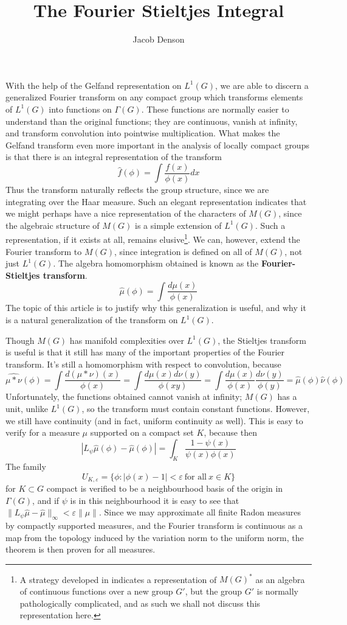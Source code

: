 \documentclass{article}
\title{The Fourier Stieltjes Integral}
\author{Jacob Denson}
\theoremstyle{plain}
\theoremstyle{definition}
\begin{document}
\maketitle

With the help of the Gelfand representation on $L^1(G)$, we are able to discern a generalized Fourier transform on any compact group which transforms elements of $L^1(G)$ into functions on $\Gamma(G)$. These functions are normally easier to understand than the original functions; they are continuous, vanish at infinity, and transform convolution into pointwise multiplication. What makes the Gelfand transform even more important in the analysis of locally compact groups is that there is an integral representation of the transform
%
\[ \widehat{f}(\phi) = \int \frac{f(x)}{\phi(x)} dx \]
%
Thus the transform naturally reflects the group structure, since we are integrating over the Haar measure. Such an elegant representation indicates that we might perhaps have a nice representation of the characters of $M(G)$, since the algebraic structure of $M(G)$ is a simple extension of $L^1(G)$. Such a representation, if it exists at all, remains elusive\footnote{A strategy developed in \cite{taylor} indicates a representation of $M(G)^*$ as an algebra of continuous functions over a new group $G'$, but the group $G'$ is normally pathologically complicated, and as such we shall not discuss this representation here.}. We can, however, extend the Fourier transform to $M(G)$, since integration is defined on all of $M(G)$, not just $L^1(G)$. The algebra homomorphism obtained is known as the {\bf Fourier-Stieltjes transform}.
%
\[ \widehat{\mu}(\phi) = \int \frac{d\mu(x)}{\phi(x)} \]
%
The topic of this article is to justify why this generalization is useful, and why it is a natural generalization of the transform on $L^1(G)$.

Though $M(G)$ has manifold complexities over $L^1(G)$, the Stieltjes transform is useful is that it still has many of the important properties of the Fourier transform. It's still a homomorphism with respect to convolution, because
%
\[ \widehat{\mu * \nu}(\phi) = \int \frac{d(\mu * \nu)(x)}{\phi(x)} = \int \frac{d \mu (x) d \nu(y)}{\phi(xy)} = \int \frac{d \mu(x)}{\phi(x)} \frac{d \nu(y)}{\phi(y)} = \widehat{\mu}(\phi) \widehat{\nu}(\phi) \]
%
Unfortunately, the functions obtained cannot vanish at infinity; $M(G)$ has a unit, unlike $L^1(G)$, so the transform must contain constant functions. However, we still have continuity (and in fact, uniform continuity as well). This is easy to verify for a measure $\mu$ supported on a compact set $K$, because then
%
\[ | L_\psi \widehat{\mu}(\phi) - \widehat{\mu}(\phi)| = \int_K \frac{1 - \psi(x)}{\psi(x) \phi(x)} \]
%
The family
%
\[ U_{K,\varepsilon} = \{ \phi : |\phi(x) - 1| < \varepsilon\ \text{for all}\ x \in K \} \]
%
for $K \subset G$ compact is verified to be a neighbourhood basis of the origin in $\Gamma(G)$, and if $\psi$ is in this neighbourhood it is easy to see that $\| L_\psi \widehat{\mu} - \widehat{\mu} \|_\infty < \varepsilon \| \mu \|$. Since we may approximate all finite Radon measures by compactly supported measures, and the Fourier transform is continuous as a map from the topology induced by the variation norm to the uniform norm, the theorem is then proven for all measures.
\end{document}
